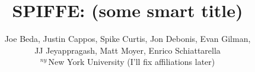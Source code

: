 \documentclass[10pt,twocolumn]{article}
\begin{document}
\title{\bf SPIFFE: (some smart title)}
\author{
Joe Beda, Justin Cappos, Spike Curtis, Jon Debonis, Evan Gilman, \\ 
JJ Jeyappragash, Matt Moyer, Enrico Schiattarella \\
${}^{ny}$\,New York University (I'll fix affiliations later)\\
}

\date{}
\maketitle
\thispagestyle{empty}







%
%

% 




{\scriptsize  } 
\end{document}
